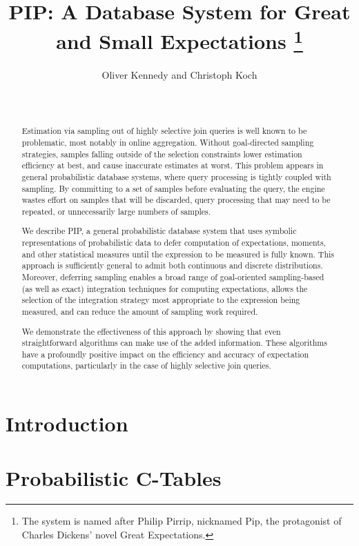 \documentclass{vldb}
\title{PIP: A Database System for Great and Small Expectations%
\thanks{The
system is named after Philip Pirrip, nicknamed Pip, the protagonist of
Charles Dickens' novel Great Expectations.}}
\author{\alignauthor Oliver Kennedy and Christoph Koch\\
\affaddr{Department of Computer Science} \\
\affaddr{Cornell University, Ithaca, NY, USA} \\
\email{\{okennedy, koch\}@cs.cornell.edu}}
\date{}
\begin{document}


\maketitle



\begin{abstract}
Estimation via sampling out of highly selective join queries is well known to be problematic, most notably in online aggregation.  Without goal-directed sampling strategies, samples falling outside of the selection constraints lower estimation efficiency at best, and cause inaccurate estimates at worst.  This problem appears in general probabilistic database systems, where query processing is tightly coupled with sampling.  By committing to a set of samples before evaluating the query, the engine wastes effort on samples that will be discarded, query processing that may need to be repeated, or unnecessarily large numbers of samples.  

We describe PIP, a general probabilistic database system that uses symbolic representations of probabilistic data to defer computation of expectations, moments, and other statistical measures until the expression to be measured is fully known.  This approach is sufficiently general to admit both continuous and discrete distributions.  Moreover, deferring sampling enables a broad range of goal-oriented sampling-based (as well as exact) integration techniques for computing expectations, allows the selection of the integration strategy most appropriate to the expression being measured, and can reduce the amount of sampling work required.  

We demonstrate the effectiveness of this approach by showing that even straightforward algorithms can make use of the added information.  These algorithms have a profoundly positive impact on the efficiency and accuracy of expectation computations, particularly in the case of highly selective join queries.
\end{abstract}



\section{Introduction}
\label{sec:introduction}


\section{Probabilistic C-Tables}
\label{sec:background}

\end{document}
